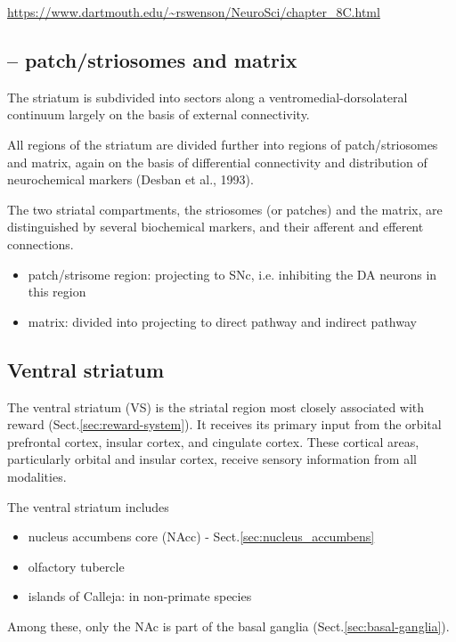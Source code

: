 \url{https://www.dartmouth.edu/~rswenson/NeuroSci/chapter_8C.html}


\subsection{-- patch/striosomes and matrix}
\label{sec:striosomes-striatum}
\label{sec:matrix-striatum}
\label{sec:patche-striatum}

The striatum is subdivided into sectors along a ventromedial-dorsolateral
continuum largely on the basis of external connectivity.

All regions of the striatum are divided further into regions of patch/striosomes
and matrix, again on the basis of differential connectivity and distribution of
neurochemical markers (Desban et al., 1993).

The two striatal compartments, the striosomes (or patches) and the matrix, are
distinguished by several biochemical markers, and their afferent
and efferent connections. 
\begin{itemize}
  \item patch/strisome region: projecting to SNc, i.e. inhibiting the DA neurons
  in this region
  
  \item matrix: divided into projecting to direct pathway and indirect pathway
\end{itemize}


\subsection{Ventral striatum}
\label{sec:ventral-striatum}

The ventral striatum (VS) is the striatal region most closely associated with
reward (Sect.\ref{sec:reward-system}).
It receives its primary input from the orbital prefrontal cortex, insular
cortex, and cingulate cortex. These cortical areas, particularly orbital and
insular cortex, receive sensory information from all modalities. 

The ventral striatum includes
\begin{itemize}
  \item nucleus accumbens core (NAcc) - Sect.\ref{sec:nucleus_accumbens}
  
  \item olfactory tubercle
  
  \item islands of Calleja: in non-primate species
\end{itemize}
Among these, only the NAc is part of the basal ganglia
(Sect.\ref{sec:basal-ganglia}).

